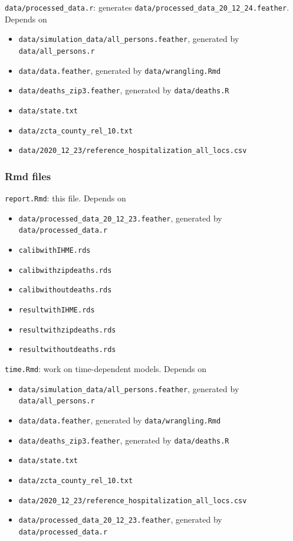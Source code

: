 \documentclass[
]{article}
\providecommand{\tightlist}{%
  \setlength{\itemsep}{0pt}\setlength{\parskip}{0pt}}
\begin{document}
\texttt{data/processed\_data.r}: generates
\texttt{data/processed\_data\_20\_12\_24.feather}. Depends on

\begin{itemize}
\tightlist
\item
  \texttt{data/simulation\_data/all\_persons.feather}, generated by
  \texttt{data/all\_persons.r}
\item
  \texttt{data/data.feather}, generated by \texttt{data/wrangling.Rmd}
\item
  \texttt{data/deaths\_zip3.feather}, generated by
  \texttt{data/deaths.R}
\item
  \texttt{data/state.txt}
\item
  \texttt{data/zcta\_county\_rel\_10.txt}
\item
  \texttt{data/2020\_12\_23/reference\_hospitalization\_all\_locs.csv}
\end{itemize}

\hypertarget{rmd-files}{%
\subsubsection{Rmd files}\label{rmd-files}}

\texttt{report.Rmd}: this file. Depends on

\begin{itemize}
\tightlist
\item
  \texttt{data/processed\_data\_20\_12\_23.feather}, generated by
  \texttt{data/processed\_data.r}
\item
  \texttt{calibwithIHME.rds}
\item
  \texttt{calibwithzipdeaths.rds}
\item
  \texttt{calibwithoutdeaths.rds}
\item
  \texttt{resultwithIHME.rds}
\item
  \texttt{resultwithzipdeaths.rds}
\item
  \texttt{resultwithoutdeaths.rds}
\end{itemize}

\texttt{time.Rmd}: work on time-dependent models. Depends on

\begin{itemize}
\tightlist
\item
  \texttt{data/simulation\_data/all\_persons.feather}, generated by
  \texttt{data/all\_persons.r}
\item
  \texttt{data/data.feather}, generated by \texttt{data/wrangling.Rmd}
\item
  \texttt{data/deaths\_zip3.feather}, generated by
  \texttt{data/deaths.R}
\item
  \texttt{data/state.txt}
\item
  \texttt{data/zcta\_county\_rel\_10.txt}
\item
  \texttt{data/2020\_12\_23/reference\_hospitalization\_all\_locs.csv}
\item
  \texttt{data/processed\_data\_20\_12\_23.feather}, generated by
  \texttt{data/processed\_data.r}
\end{itemize}
\end{document}
